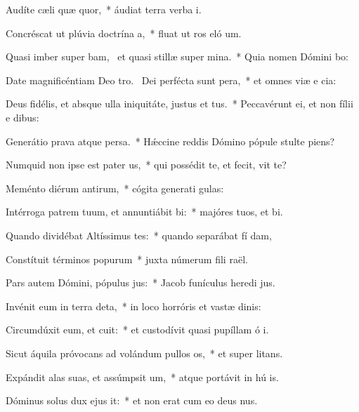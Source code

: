 \item Audíte cæli quæ quor,~* áudiat terra verba  i.
\item Concréscat ut plúvia doctrína a,~* fluat ut ros eló um.
\item Quasi imber super bam,~\pscross{} et quasi stillæ super mina.~* Quia nomen Dómini bo:
\item Date magnificéntiam Deo tro.~\pscross{} Dei perfécta sunt pera,~* et omnes viæ e cia:
\item Deus fidélis, et absque ulla iniquitáte, justus et tus.~* Peccavérunt ei, et non fílii e  dibus:
\item Generátio prava atque persa.~* Hǽccine reddis Dómino pópule stulte  piens?
\item Numquid non ipse est pater us,~* qui possédit te, et fecit,  vit te?
\item Meménto diérum antirum,~* cógita generati gulas:
\item Intérroga patrem tuum, et annuntiábit bi:~* majóres tuos, et  bi.
\item Quando dividébat Altíssimus tes:~* quando separábat fí dam,
\item Constítuit términos popurum~* juxta númerum fili raël.
\item Pars autem Dómini, pópulus jus:~* Jacob funículus heredi jus.
\item Invénit eum in terra deta,~* in loco horróris et vastæ dinis:
\item Circumdúxit eum, et cuit:~* et custodívit quasi pupíllam ó i.
\item Sicut áquila próvocans ad volándum pullos os,~* et super  litans.
\item Expándit alas suas, et assúmpsit um,~* atque portávit in hú is.
\item Dóminus solus dux ejus it:~* et non erat cum eo deus nus.
